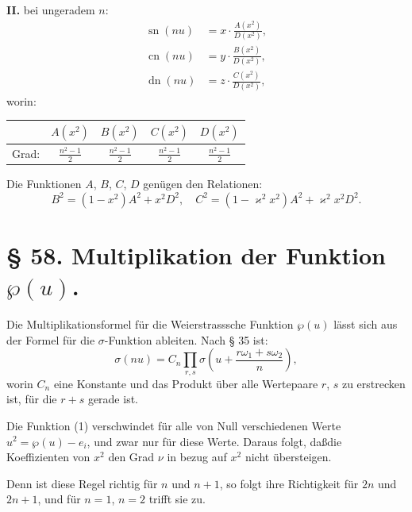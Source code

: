 \documentclass[12pt,a4paper]{article}
\theoremstyle{definition}
\begin{document}
\textbf{II.} bei ungeradem $n$:
\begin{equation}\tag{4}
\begin{aligned}
\operatorname{sn}(nu) &= x \cdot \frac{A(x^2)}{D(x^2)},\\
\operatorname{cn}(nu) &= y \cdot \frac{B(x^2)}{D(x^2)},\\
\operatorname{dn}(nu) &= z \cdot \frac{C(x^2)}{D(x^2)},
\end{aligned}
\end{equation}
worin:
\begin{center}
\begin{tabular}{c|cccc}
& $A(x^2)$ & $B(x^2)$ & $C(x^2)$ & $D(x^2)$ \\
\hline
Grad: & $\frac{n^2 - 1}{2}$ & $\frac{n^2 - 1}{2}$ & $\frac{n^2 - 1}{2}$ & $\frac{n^2 - 1}{2}$
\end{tabular}
\end{center}

Die Funktionen $A$, $B$, $C$, $D$ gen\"{u}gen den Relationen:
\begin{equation}\tag{5}
B^2 = (1 - x^2)A^2 + x^2 D^2, \quad C^2 = (1 - \varkappa^2x^2)A^2 + \varkappa^2x^2 D^2.
\end{equation}

\section*{\S{} 58. Multiplikation der Funktion $\wp(u)$.}

Die Multiplikationsformel f\"{u}r die Weierstrasssche Funktion
$\wp(u)$ l\"{a}sst sich aus der Formel f\"{u}r die $\sigma$-Funktion ableiten.
Nach \S{} 35 ist:
\begin{equation}\tag{1}
\sigma(nu) = C_n \prod_{r,s} \sigma\left(u + \frac{r\omega_1 + s\omega_2}{n}\right),
\end{equation}
worin $C_n$ eine Konstante und das Produkt \"{u}ber alle Wertepaare
$r$, $s$ zu erstrecken ist, f\"{u}r die $r + s$ gerade ist.

Die Funktion (1) verschwindet f\"{u}r alle von Null verschiedenen
Werte $u^2 = \wp(u) - e_i$, und zwar nur f\"{u}r diese Werte.
Daraus folgt, da\ss die Koeffizienten von $x^2$ den Grad $\nu$ in bezug
auf $x^2$ nicht \"{u}bersteigen.

Denn ist diese Regel richtig f\"{u}r $n$ und $n + 1$, so
folgt ihre Richtigkeit f\"{u}r $2n$ und $2n + 1$, und f\"{u}r $n = 1$, $n = 2$
trifft sie zu.
\end{document}
